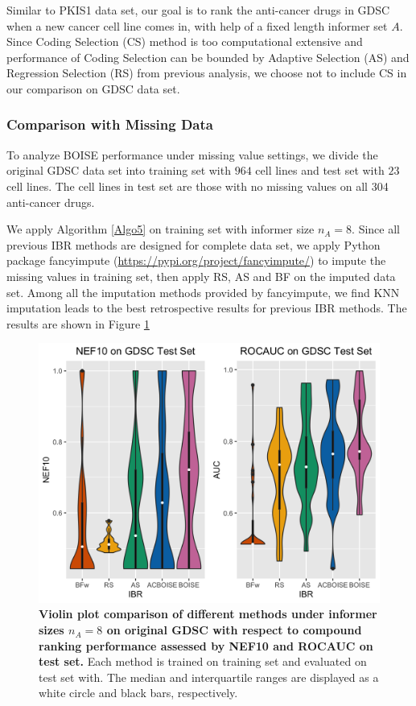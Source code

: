 \documentclass[12pt]{article}
\begin{document}
Similar to PKIS1 data set, our goal is to rank the anti-cancer drugs in GDSC when a new cancer cell line comes in, with help of a fixed length informer set $A$.  Since Coding Selection (CS) method is too computational extensive and  performance of Coding Selection can be bounded by Adaptive Selection (AS) and Regression Selection (RS) from previous analysis, we choose not to include CS in our comparison on GDSC data set. 

\subsubsection{Comparison with Missing Data}
To analyze BOISE performance under missing value settings, we divide the original GDSC data set into training set with $964$ cell lines and test set with $23$ cell lines. The cell lines in test set are those with no missing values on all 304 anti-cancer drugs.  

We apply Algorithm \ref{Algo5} on training set with informer size $n_A = 8$. Since all previous IBR methods are designed for complete data set, we apply Python package fancyimpute (\url{https://pypi.org/project/fancyimpute/}) to impute the missing values in training set, then apply RS, AS and BF on the imputed data set. Among all the imputation methods provided by fancyimpute, we find KNN imputation leads to the best retrospective results for previous IBR methods. The results are shown in Figure \ref{fig:mgdsc}

\begin{figure}[!ht]
\centering
\includegraphics[width=5.0in]{mGDSC8.png}
\caption{\label{fig:mgdsc} 
{\bf Violin plot comparison of different methods under informer sizes $n_A =8$ on original GDSC with respect to compound ranking performance assessed by NEF10 and ROCAUC on test set.} Each method is trained on training set and evaluated on test set with. The median and interquartile ranges are displayed as a white circle and black bars, respectively.}
\end{figure}
\end{document}

